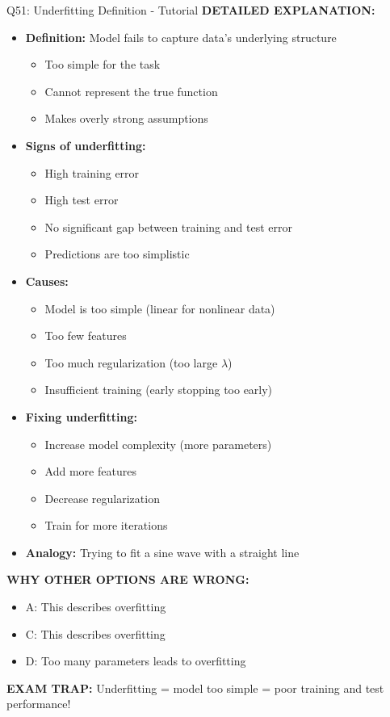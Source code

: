 \documentclass[8pt]{beamer}
\begin{document}
\begin{frame}{Q51: Underfitting Definition - Tutorial}
		\vspace{0.05cm}
		\textbf{DETAILED EXPLANATION:}
		\begin{itemize}
			\item \textbf{Definition:} Model fails to capture data's underlying structure
			\begin{itemize}
				\item Too simple for the task
				\item Cannot represent the true function
				\item Makes overly strong assumptions
			\end{itemize}
			\item \textbf{Signs of underfitting:}
			\begin{itemize}
				\item High training error
				\item High test error
				\item No significant gap between training and test error
				\item Predictions are too simplistic
			\end{itemize}
			\item \textbf{Causes:}
			\begin{itemize}
				\item Model is too simple (linear for nonlinear data)
				\item Too few features
				\item Too much regularization (too large $\lambda$)
				\item Insufficient training (early stopping too early)
			\end{itemize}
			\item \textbf{Fixing underfitting:}
			\begin{itemize}
				\item Increase model complexity (more parameters)
				\item Add more features
				\item Decrease regularization
				\item Train for more iterations
			\end{itemize}
			\item \textbf{Analogy:} Trying to fit a sine wave with a straight line
		\end{itemize}
		
		\vspace{0.05cm}
		\textcolor{myred}{\textbf{WHY OTHER OPTIONS ARE WRONG:}}
		\begin{itemize}
			\item \textcolor{myred}{A:} This describes overfitting
			\item \textcolor{myred}{C:} This describes overfitting
			\item \textcolor{myred}{D:} Too many parameters leads to overfitting
		\end{itemize}
		
		\textcolor{myred}{\textbf{EXAM TRAP:}} Underfitting = model too simple = poor training and test performance!
	\end{frame}
	
\end{document}

